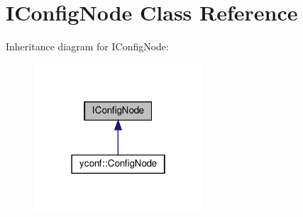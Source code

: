 \hypertarget{classIConfigNode}{}\section{I\+Config\+Node Class Reference}
\label{classIConfigNode}


Inheritance diagram for I\+Config\+Node\+:
\nopagebreak
\begin{figure}[H]
\begin{center}
\leavevmode
\includegraphics[width=178pt]{classIConfigNode__inherit__graph}
\end{center}
\end{figure}
